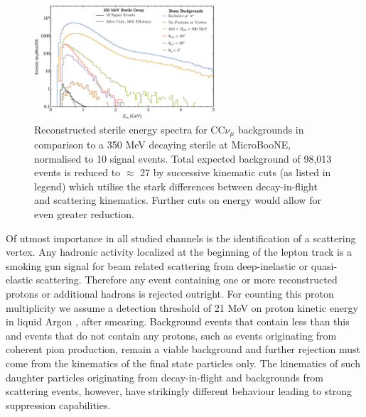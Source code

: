 \documentclass[11pt, a4paper]{article}
\def\muboone{MicroBooNE}
\begin{document}
\begin{figure}[h]
\center
\includegraphics[width=0.6\textwidth,clip,trim=0 0 0 0]{figures/mu_pi_cutflow.pdf}

\caption{\label{fig:mu_pi_cutflow} Reconstructed sterile energy spectra for
CC$\nu_\mu$ backgrounds in comparison to a 350 MeV decaying sterile at
\muboone, normalised to 10 signal events. Total expected background of 98,013
events is reduced to $\approx$ 27 by successive kinematic cuts (as listed in legend) which utilise
the stark differences between decay-in-flight and scattering kinematics. Further cuts on energy would allow for even greater reduction. }
\end{figure}

Of utmost importance in all studied channels is the identification of a
scattering vertex. Any hadronic activity localized at the beginning of the
lepton track is a smoking gun signal for beam related scattering from
deep-inelastic or quasi-elastic scattering. Therefore any event containing one
or more reconstructed protons or additional hadrons is rejected outright. For
counting this proton multiplicity we assume a detection threshold of 21 MeV on
proton kinetic energy in liquid Argon \cite{Acciarri:2014gev}, after smearing.
Background events that contain less than this and events that do not contain
any protons, such as events originating from coherent pion production, remain a
viable background and further rejection must come from the kinematics of the
final state particles only. The kinematics of such daughter particles
originating from decay-in-flight and backgrounds from scattering events,
however,  have strikingly different behaviour leading to strong suppression
capabilities.
\end{document}
